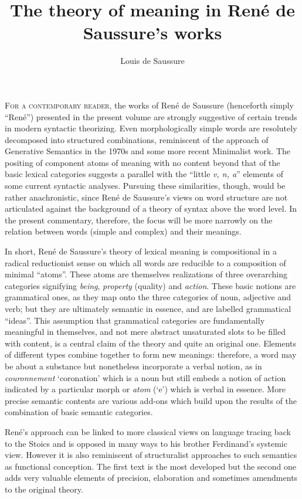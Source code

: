 \documentclass[output=paper]{langsci/langscibook}
\author{Louis de Saussure\affiliation{Université de Neuchâtel}}
\title{The theory of meaning in René de Saussure's works}
\begin{document}
 
 \label{sec:semantics} 
\lettrine[loversize=0.1, nindent=0em]{F}{or a contemporary reader,} 
 the works of René de Saussure (henceforth simply ``René'') presented in
 the present volume are strongly suggestive of certain trends in
 modern syntactic theorizing.  Even morphologically simple words are
 resolutely decomposed into structured combinations, reminiscent of
 the approach of Generative Semantics in the 1970s and some more
 recent Minimalist work. The positing of component atoms of meaning
 with no content beyond that of the basic lexical categories suggests
 a parallel with the ``little \emph{v, n, a}'' elements of some
 current syntactic analyses. Pursuing these similarities, though,
 would be rather anachronistic, since René de Saussure's views on word
 structure are not articulated against the background of a theory of
 syntax above the word level. In the present commentary, therefore,
 the focus will be more narrowly on the relation between words (simple
 and complex) and their meanings.

In short, René de Saussure’s theory of lexical meaning is
compositional in a radical reductionist sense on which all words are
reducible to a composition of minimal ``atoms''.  These atoms are
themselves realizations of three overarching categories signifying
\emph{being}, \emph{property} (quality) and \emph{action}. These basic
notions are grammatical ones, as they map onto the three categories of
noun, adjective and verb; but they are ultimately semantic in essence,
and are labelled grammatical ``ideas''. This assumption that grammatical
categories are fundamentally meaningful in themselves, and not mere
abstract unsaturated slots to be filled with content, is a central
claim of the theory and quite an original one. Elements of different
types combine together to form new meanings: therefore, a word may be
about a substance but nonetheless incorporate a verbal notion, as in
\emph{couronnement} `coronation’ which is a noun but still embeds a
notion of action indicated by a particular morph or \emph{atom} (`e’)
which is verbal in essence. More precise semantic contents are various
add-ons which build upon the results of the combination of basic
semantic categories.

René’s approach can be linked to more classical views on language
tracing back to the Stoics and is opposed in many ways to his brother
Ferdinand’s systemic view.  However it is also reminiscent of
structuralist approaches to such semantics as
 functional conception. The first
text \citep{r.desaussure11:formation} is the most developed but the
second one \citep{r.desaussure19:structure.logique} adds very valuable
elements of precision, elaboration and sometimes amendments to the
original theory.
  
\end{document}
